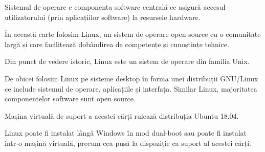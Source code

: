 Sistemul de operare e componenta software centrală ce asigură accesul utilizatorului (prin aplicațiilor software) la resursele hardware.

În această carte folosim Linux, un sistem de operare open source cu o comunitate largă și care facilitează dobândirea de competențe și cunoștințe tehnice.

Din punct de vedere istoric, Linux este un sistem de operare din familia Unix.

De obicei folosim Linux pe sisteme desktop în forma unei distribuții GNU/Linux ce include sistemul de operare, aplicațiile și interfața. Similar Linux, majoritatea componentelor software sunt open source.

Mașina virtuală de suport a acestei cărți rulează distribuția Ubuntu 18.04.

Linux poate fi instalat lângă Windows în mod dual-boot sau poate fi instalat într-o mașină virtuală, precum cea pusă la dispoziție ca suport al acestei cărți.
